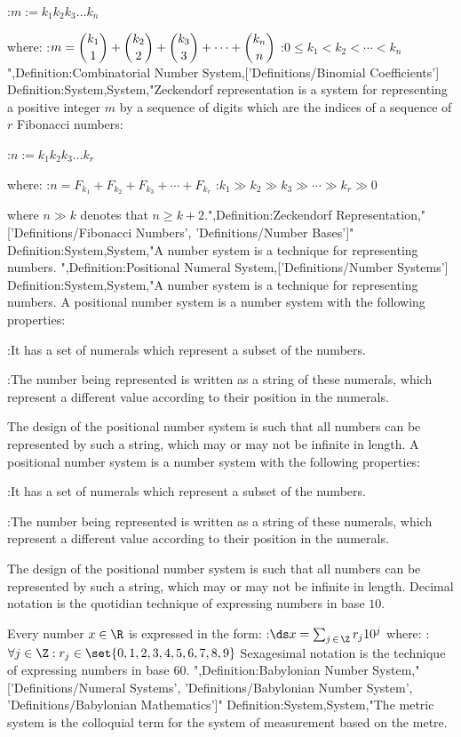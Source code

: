 :$m := k_1 k_2 k_3 \ldots k_n$

where:
:$m = \dbinom {k_1} 1 + \dbinom {k_2} 2 + \dbinom {k_3} 3 + \cdots + \dbinom {k_n} n$
:$0 \le k_1 < k_2 < \cdots < k_n$",Definition:Combinatorial Number System,['Definitions/Binomial Coefficients']
Definition:System,System,"Zeckendorf representation is a system for representing a positive integer $m$ by a sequence of digits which are the indices of a sequence of $r$ Fibonacci numbers:

:$n := k_1 k_2 k_3 \ldots k_r$

where:
:$n = F_{k_1} + F_{k_2} + F_{k_3} + \cdots + F_{k_r}$
:$k_1 \gg k_2 \gg k_3 \gg \cdots \gg k_r \gg 0$

where $n \gg k$ denotes that $n \ge k + 2$.",Definition:Zeckendorf Representation,"['Definitions/Fibonacci Numbers', 'Definitions/Number Bases']"
Definition:System,System,"A number system is a technique for representing numbers.
",Definition:Positional Numeral System,['Definitions/Number Systems']
Definition:System,System,"A number system is a technique for representing numbers.
A positional number system is a number system with the following properties:

:It has a set of numerals which represent a subset of the numbers.

:The number being represented is written as a string of these numerals, which represent a different value according to their position in the numerals.

The design of the positional number system is such that all numbers can be represented by such a string, which may or may not be infinite in length.
A positional number system is a number system with the following properties:

:It has a set of numerals which represent a subset of the numbers.

:The number being represented is written as a string of these numerals, which represent a different value according to their position in the numerals.

The design of the positional number system is such that all numbers can be represented by such a string, which may or may not be infinite in length.
Decimal notation is the quotidian technique of expressing numbers in base $10$.

Every number $x \in \R$ is expressed in the form:
:$\ds x = \sum_{j \mathop \in \Z} r_j 10^j$
where:
:$\forall j \in \Z: r_j \in \set {0, 1, 2, 3, 4, 5, 6, 7, 8, 9}$
Sexagesimal notation is the technique of expressing numbers in base $60$.
",Definition:Babylonian Number System,"['Definitions/Numeral Systems', 'Definitions/Babylonian Number System', 'Definitions/Babylonian Mathematics']"
Definition:System,System,"The metric system is the colloquial term for the system of measurement based on the metre.

